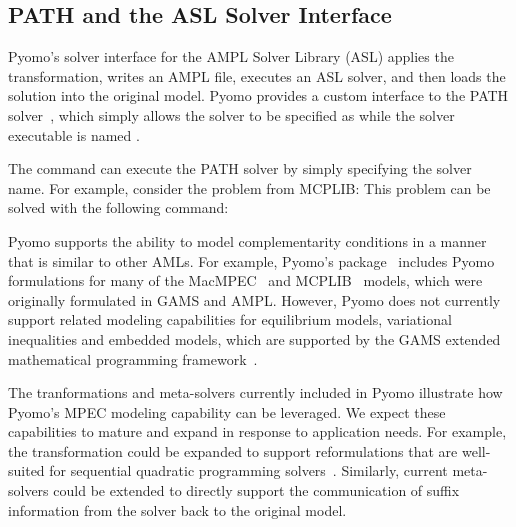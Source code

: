 \subsection{PATH and the ASL Solver Interface}

Pyomo's solver interface for the AMPL Solver Library (ASL) applies
the  transformation, writes an AMPL  file, executes
an ASL solver, and then loads the solution into the original model.
Pyomo provides a custom interface to the PATH solver~\cite{FerMun98},
which simply allows the solver to be specified as  while
the solver executable is named .

The  command can execute the PATH solver by simply specifying the 
 solver name.  For example, consider the  problem 
from MCPLIB:
This problem can be solved with the following command:
\fi



\label{sec:discussion}

Pyomo supports the ability to model complementarity conditions in a manner that is
similar to other AMLs.  For example, Pyomo's 
package~\cite{pyomo.data} includes Pyomo formulations for many of
the \mbox{MacMPEC}~\cite{MacMPEC} and MCPLIB~\cite{MCPLIB} models, which were originally formulated in GAMS and AMPL.  However,
Pyomo does not currently support related modeling capabilities for
equilibrium models, variational inequalities and embedded models,
which are supported by the GAMS extended mathematical programming
framework~\cite{FerDirJagMee09}.

The tranformations and meta-solvers currently included in Pyomo
illustrate how Pyomo's MPEC modeling capability can be leveraged.
We expect these capabilities to mature and expand in response to
application needs.  For example, the 
transformation could be expanded to support reformulations that
are well-suited for sequential quadratic programming solvers~\cite{Ley06}.
Similarly, current meta-solvers could be extended to directly
support the communication of suffix information from the solver
back to the original model.

